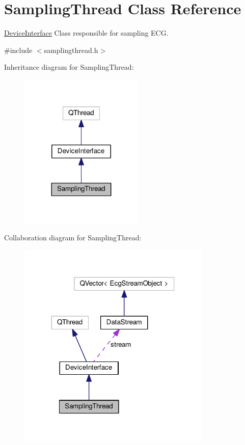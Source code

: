 \hypertarget{classSamplingThread}{}\section{Sampling\+Thread Class Reference}
\label{classSamplingThread}


\hyperlink{classDeviceInterface}{Device\+Interface} Class responsible for sampling E\+CG.  




{\ttfamily \#include $<$samplingthread.\+h$>$}



Inheritance diagram for Sampling\+Thread\+:
\nopagebreak
\begin{figure}[H]
\begin{center}
\leavevmode
\includegraphics[width=167pt]{classSamplingThread__inherit__graph}
\end{center}
\end{figure}


Collaboration diagram for Sampling\+Thread\+:
\nopagebreak
\begin{figure}[H]
\begin{center}
\leavevmode
\includegraphics[width=261pt]{classSamplingThread__coll__graph}
\end{center}
\end{figure}
